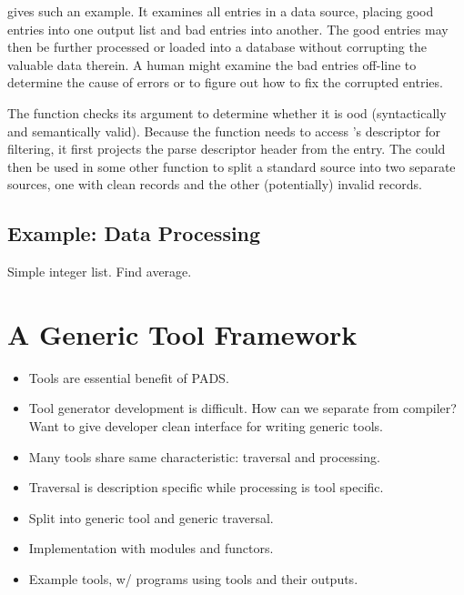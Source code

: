  gives such an example.  It examines all
entries in a \dibbler{} data source, placing good entries into one
output list and bad entries into another.  The good entries may then
be further processed or loaded into a database without corrupting the
valuable data therein.  A human might examine the bad entries off-line
to determine the cause of errors or to figure out how to fix the
corrupted entries.

The  function checks its argument  to
determine whether it is ood (syntactically and semantically
valid).  Because the function needs to access 's descriptor for
filtering, it first projects the parse descriptor header from the
entry.  The  could then be used in some other function
to split a standard \dibbler{} source into two separate sources, one
with clean records and the other (potentially) invalid records.


\subsection{Example: Data Processing}
\label{sec:ex-process}

Simple integer list. Find average.

\section{A Generic Tool Framework}
\label{sec:gen-tool}

\begin{itemize}
\item Tools are essential benefit of PADS.
\item Tool generator development is difficult. How can we separate
  from compiler? Want to give developer clean interface for writing
  generic tools.
\item Many tools share same characteristic: traversal and processing.
\item Traversal is description specific while processing is tool specific.
\item Split into generic tool and generic traversal.
\item Implementation with modules and functors.
\item Example tools, w/ programs using tools and their outputs.
\end{itemize}




